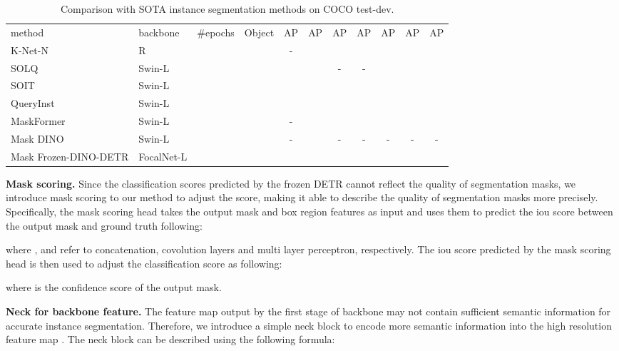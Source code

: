 \documentclass[10pt,twocolumn,letterpaper]{article}
\newcommand{\cmark}{\ding{51}}\newcommand{\xmark}{\ding{55}}
\begin{document}
\begin{table*}[t]
\begin{minipage}[t]{1\linewidth}
{\begin{tabular}{l|l|c|c|c|cccccc}
method & backbone & \#epochs  & Object & AP & AP & AP & AP & AP & AP & AP \\
\shline
K-Net-N~\cite{zhang2021k} & R &   & \xmark & - &  &  &  &  &  &  \\
SOLQ~\cite{dong2021solq} & Swin-L &  & \xmark &  &  & - & - &  &  &  \\
SOIT~\cite{yu2022soit} & Swin-L &  & \xmark & &  &  &  &  &  &  \\
QueryInst~\cite{FangQueryInst} & Swin-L &  & \xmark &  &  &  &  &  &  &  \\
MaskFormer~\cite{cheng2021masked} & Swin-L &  & \xmark & - &  &  &  &  &  &  \\
Mask DINO~\cite{li2022mask} & Swin-L &  & \cmark & - &  & - & - & - & - & - \\
\rowcolor{gray!8}Mask Frozen-DINO-DETR & FocalNet-L &  & \cmark &  &  &  &  &  &  &  \\
\end{tabular}
}
\caption{\small{{
Comparison with SOTA instance segmentation methods on COCO test-dev.}}
}
\label{tab:coco_test}
\end{minipage}
\end{table*}


\vspace{1mm}
\noindent\textbf{Mask scoring.}
Since the classification scores predicted by the frozen DETR cannot reflect the quality of segmentation masks, we introduce mask scoring \cite{huang2019mask} to our method to adjust the score, making it able to describe the quality of segmentation masks more precisely. Specifically, the mask scoring head takes the output mask and box region features as input and uses them to predict the iou score between the output mask and ground truth following:

where ,  and  refer to concatenation, covolution layers and multi layer perceptron, respectively.
The iou score predicted by the mask scoring head is then used to adjust the classification score as following:

where  is the confidence score of the output mask.


\vspace{1mm}
\noindent\textbf{Neck for backbone feature.}
The feature map output by the first stage of backbone   may not contain sufficient semantic information for accurate instance segmentation. Therefore, we introduce a simple neck block to encode more semantic information into the high resolution feature map  . The neck block can be described using the following formula:
\end{document}
